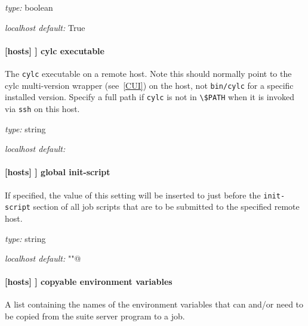 \begin{myitemize}
\item {\em type:} boolean
\item {\em localhost default:} True
\end{myitemize}

\paragraph[cylc executable]{[hosts] \textrightarrow [[HOST]] \textrightarrow cylc executable }

The \lstinline=cylc= executable on a remote host. Note this should normally
point to the cylc multi-version wrapper (see~\ref{CUI}) on the host, not
\lstinline=bin/cylc= for a specific installed version.
Specify a full path if \lstinline=cylc= is not in \lstinline=\$PATH= when it is
invoked via \lstinline=ssh= on this host.

\begin{myitemize}
\item {\em type:} string
\item {\em localhost default:} \lstinline@cylc@
\end{myitemize}

\paragraph[global init-script]{[hosts] \textrightarrow [[HOST]] \textrightarrow global init-script }
\label{GlobalInitScript}

If specified, the value of this setting will be inserted to just before the
\lstinline=init-script= section of all job scripts that are to be
submitted to the specified remote host.

\begin{myitemize}
\item {\em type:} string
\item {\em localhost default:} \lstinline@""@
\end{myitemize}

\paragraph[copyable environment variables]{[hosts] \textrightarrow [[HOST]] \textrightarrow copyable environment variables }

A list containing the names of the environment variables that can and/or need
to be copied from the suite server program to a job.

